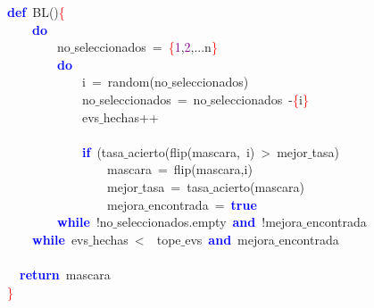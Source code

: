 \noindent
\mbox{}\textbf{\textcolor{Blue}{def}}\ BL\textcolor{BrickRed}{()}\textcolor{Red}{\{} \\
\mbox{}\ \ \ \ \textbf{\textcolor{Blue}{do}} \\
\mbox{}\ \ \ \ \ \ \ \ no$\_$seleccionados\ \textcolor{BrickRed}{=}\ \textcolor{Red}{\{}\textcolor{Purple}{1}\textcolor{BrickRed}{,}\textcolor{Purple}{2}\textcolor{BrickRed}{,...}n\textcolor{Red}{\}} \\
\mbox{}\ \ \ \ \ \ \ \ \textbf{\textcolor{Blue}{do}} \\
\mbox{}\ \ \ \ \ \ \ \ \ \ \ \ i\ \textcolor{BrickRed}{=}\ random\textcolor{BrickRed}{(}no$\_$seleccionados\textcolor{BrickRed}{)} \\
\mbox{}\ \ \ \ \ \ \ \ \ \ \ \ no$\_$seleccionados\ \textcolor{BrickRed}{=}\ no$\_$seleccionados\ \textcolor{BrickRed}{-}\textcolor{Red}{\{}i\textcolor{Red}{\}} \\
\mbox{}\ \ \ \ \ \ \ \ \ \ \ \ evs$\_$hechas\textcolor{BrickRed}{++} \\
\mbox{} \\
\mbox{}\ \ \ \ \ \ \ \ \ \ \ \ \textbf{\textcolor{Blue}{if}}\ \textcolor{BrickRed}{(}tasa$\_$acierto\textcolor{BrickRed}{(}flip\textcolor{BrickRed}{(}mascara\textcolor{BrickRed}{,}\ i\textcolor{BrickRed}{)}\ \textcolor{BrickRed}{\textgreater{}}\ mejor$\_$tasa\textcolor{BrickRed}{)} \\
\mbox{}\ \ \ \ \ \ \ \ \ \ \ \ \ \ \ \ mascara\ \textcolor{BrickRed}{=}\ flip\textcolor{BrickRed}{(}mascara\textcolor{BrickRed}{,}i\textcolor{BrickRed}{)} \\
\mbox{}\ \ \ \ \ \ \ \ \ \ \ \ \ \ \ \ mejor$\_$tasa\ \textcolor{BrickRed}{=}\ tasa$\_$acierto\textcolor{BrickRed}{(}mascara\textcolor{BrickRed}{)} \\
\mbox{}\ \ \ \ \ \ \ \ \ \ \ \ \ \ \ \ mejora$\_$encontrada\ \textcolor{BrickRed}{=}\ \textbf{\textcolor{Blue}{true}} \\
\mbox{}\ \ \ \ \ \ \ \ \textbf{\textcolor{Blue}{while}}\ \textcolor{BrickRed}{!}no$\_$seleccionados\textcolor{BrickRed}{.}empty\ \textbf{\textcolor{Blue}{and}}\ \textcolor{BrickRed}{!}mejora$\_$encontrada \\
\mbox{}\ \ \ \ \textbf{\textcolor{Blue}{while}}\ evs$\_$hechas\ \textcolor{BrickRed}{\textless{}}\ \ tope$\_$evs\ \textbf{\textcolor{Blue}{and}}\ mejora$\_$encontrada \\
\mbox{} \\
\mbox{}\ \ \textbf{\textcolor{Blue}{return}}\ mascara \\
\mbox{}\textcolor{Red}{\}} \\
\mbox{}
